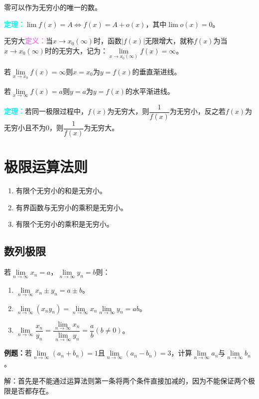\documentclass[UTF8, 12pt]{ctexart}
\begin{document}
零可以作为无穷小的唯一的数。

\textcolor{aqua}{\textbf{定理：}}$\lim f(x)=A\Leftrightarrow f(x)=A+o(x)$，其中$\lim o(x)=0$。

无穷大\textcolor{violet}{\textbf{定义：}}当$x\to x_0(\infty)$时，函数$\vert f(x)\vert$无限增大，就称$f(x)$为当$x\to x_0(\infty)$时的无穷大，记为：$\lim\limits_{x\to x_0(\infty)}f(x)=\infty$。

若$\lim\limits_{x\to x_0}f(x)=\infty$则$x=x_0$为$y=f(x)$的垂直渐进线。

若$\lim\limits_{x\to\infty}f(x)=a$则$y=a$为$y=f(x)$的水平渐进线。

\textcolor{aqua}{\textbf{定理：}}若同一极限过程中，$f(x)$为无穷大，则$\dfrac{1}{f(x)}$为无穷小，反之若$f(x)$为无穷小且不为0，则$\dfrac{1}{f(x)}$为无穷大。

\section{极限运算法则}

\begin{enumerate}
    \item 有限个无穷小的和是无穷小。
    \item 有界函数与无穷小的乘积是无穷小。
    \item 有限个无穷小的乘积是无穷小。
\end{enumerate}

\subsection{数列极限}

若$\lim\limits_{n\to\infty}x_n=a$，$\lim\limits_{n\to\infty}y_n=b$则：

\begin{enumerate}
    \item $\lim\limits_{n\to\infty}x_n\pm y_n=a\pm b$。
    \item $\lim\limits_{n\to\infty}(x_ny_n)=\lim\limits_{n\to\infty}x_n\lim\limits_{n\to\infty}y_n=ab$。
    \item $\lim\limits_{n\to\infty}\dfrac{x_n}{y_n}=\dfrac{\lim\limits_{n\to\infty}x_n}{\lim\limits_{n\to\infty}y_n}=\dfrac{a}{b}(b\neq 0)$。
\end{enumerate}

\textbf{例题：}若$\lim\limits_{n\to\infty}(a_n+b_n)=1$且$\lim\limits_{n\to\infty}(a_n-b_n)=3$，计算$\lim\limits_{n\to\infty}a_n$与$\lim\limits_{n\to\infty}b_n$。

解：首先是不能通过运算法则第一条将两个条件直接加减的，因为不能保证两个极限是否都存在。
\end{document}
